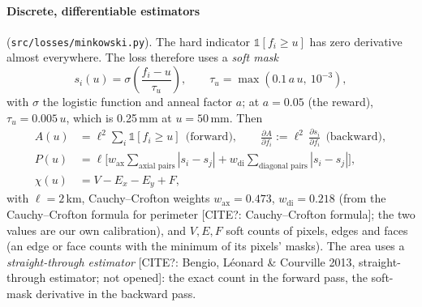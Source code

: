 \documentclass[11pt,a4paper]{article}
\newcommand{\citeq}[1]{\textcolor{red!70!black}{[CITE?: #1]}}
\begin{document}
\paragraph{Discrete, differentiable estimators} (\texttt{src/losses/minkowski.py}). The hard indicator
$\mathbb 1[f_i\ge u]$ has zero derivative almost everywhere. The loss therefore uses a \emph{soft mask}
\begin{equation}\label{eq:mask}
  s_i(u) = \sigma\!\left(\frac{f_i-u}{\tau_u}\right),\qquad \tau_u = \max(0.1\, a\, u,\ 10^{-3}),
\end{equation}
with $\sigma$ the logistic function and anneal factor $a$; at $a = 0.05$ (the reward), $\tau_u = 0.005\,u$, which is
0.25\,mm at $u = 50$\,mm. Then
\begin{align}
  A(u) &= \ell^2\sum_i \mathbb 1[f_i\ge u]\ \ \text{(forward)},\qquad
         \frac{\partial A}{\partial f_i} := \ell^2\,\frac{\partial s_i}{\partial f_i}\ \ \text{(backward)},\\
  P(u) &= \ell\Big[w_{\mathrm{ax}}\!\!\sum_{\text{axial pairs}}\!|s_i-s_j| + w_{\mathrm{di}}\!\!\sum_{\text{diagonal pairs}}\!|s_i-s_j|\Big],\\
  \chi(u) &= V - E_x - E_y + F ,
\end{align}
with $\ell = 2$\,km, Cauchy--Crofton weights $w_{\mathrm{ax}} = 0.473$, $w_{\mathrm{di}} = 0.218$ (from the Cauchy--Crofton
formula for perimeter \citeq{Cauchy--Crofton formula}; the two values are our own calibration), and $V,E,F$ soft counts
of pixels, edges and faces (an edge or face counts with the minimum of its pixels' masks). The area uses a
\emph{straight-through estimator} \citeq{Bengio, L\'eonard \& Courville 2013, straight-through estimator; not opened}:
the exact count in the forward pass, the soft-mask derivative in the backward pass.
\end{document}
